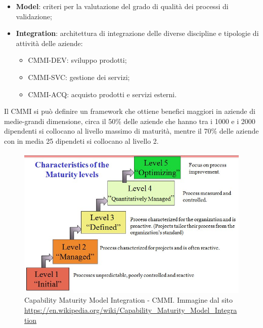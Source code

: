 \begin{itemize}
\begin{itemize}
	\end{itemize}
	\item \textbf{Model}: criteri per la valutazione del grado di qualità dei processi di validazione;
	\item \textbf{Integration}: architettura di integrazione delle diverse discipline e tipologie di attività delle aziende:
	\begin{itemize}
		\item CMMI-DEV: sviluppo prodotti;
		\item CMMI-SVC: gestione dei servizi;
		\item CMMI-ACQ: acquisto prodotti e servizi esterni.
	\end{itemize}	 
\end{itemize}
Il CMMI si può definire un framework che ottiene benefici maggiori in aziende di medie-grandi dimensione, circa il 50\% delle aziende che hanno tra i 1000 e i 2000 dipendenti si collocano al livello massimo di maturità, mentre il 70\% delle aziende con in media 25 dipendeti si collocano al livello 2.

\begin{figure}[H]
\centering
	\includegraphics[width=0.7\linewidth]{./images/Characteristics_of_the_Maturity_levels.jpg} 
	\caption{Capability Maturity Model Integration - CMMI. Immagine dal sito \url{https://en.wikipedia.org/wiki/Capability_Maturity_Model_Integration}}
	\label{cmmi}
\end{figure}


